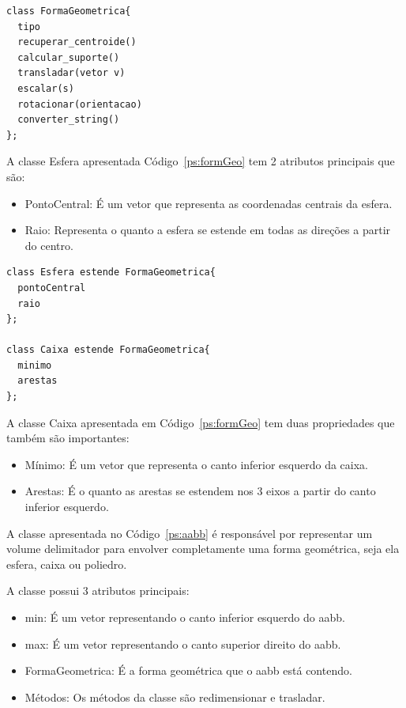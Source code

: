 \begin{lstlisting}[frame=single,caption=Modelagem prévia para interface de forma geométrica\label{ps:geometricshape}]
class FormaGeometrica{
  tipo
  recuperar_centroide()
  calcular_suporte()
  transladar(vetor v)
  escalar(s)
  rotacionar(orientacao)
  converter_string()
};
\end{lstlisting}

A classe Esfera apresentada Código~\ref{ps:formGeo} tem 2 atributos principais que são:
\begin{itemize}
  \item PontoCentral: É um vetor que representa as coordenadas centrais da esfera.
  \item Raio: Representa o quanto a esfera se estende em todas as direções a partir do centro.
\end{itemize}

\begin{lstlisting}[frame=single,caption=Modelagem prévia para esfera 3d e caixa \label{ps:formGeo}]
class Esfera estende FormaGeometrica{
  pontoCentral
  raio
};

class Caixa estende FormaGeometrica{
  minimo
  arestas
};
\end{lstlisting}



A classe Caixa apresentada em Código~\ref{ps:formGeo} tem duas propriedades que também são importantes:
\begin{itemize}
  \item Mínimo: É um vetor que representa o canto inferior esquerdo da caixa.
  \item Arestas: É o quanto as arestas se estendem nos 3 eixos a partir do canto inferior esquerdo.
\end{itemize}

A classe apresentada no Código~\ref{ps:aabb}  é responsável por representar um volume delimitador para envolver completamente uma forma geométrica, seja ela esfera, caixa ou poliedro.

A classe possui 3 atributos principais:
\begin{itemize}
  \item min: É um vetor representando o canto inferior esquerdo do aabb.
  \item max: É um vetor representando o canto superior direito do aabb.
  \item FormaGeometrica: É a forma geométrica que o aabb está contendo.
  \item Métodos: Os métodos da classe são redimensionar e trasladar.
\end{itemize}

